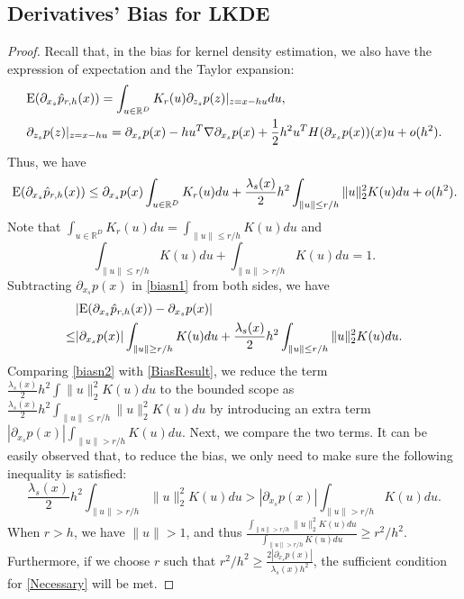 \documentclass[aos,preprint]{imsart}
\theoremstyle{remark}
\begin{document}
\begin{appendix}
\subsection{Derivatives' Bias for LKDE}
\begin{proof}\label{LKDE bias}
Recall that, in the bias for kernel density estimation, we also have the expression of expectation and the Taylor expansion:
\[
\begin{aligned}
&{\rm E} (\partial_{x_s} \hat{p}_{r,h}(x)) = \int_ {u\in \mathbb{R}^D} K_r(u) \partial_{z_s}p(z)|_{z=x-hu} d u,\\
&\partial_{z_s} p(z)|_{z=x-hu}= \partial_{x_s} p(x) -  h u^T\nabla \partial_{x_s} p(x) + \frac{1}{2}h^2 u^T H(\partial_{x_s}p(x))(x)u + o(h^2).
\end{aligned}
\]
Thus, we have
\begin{equation}\label{biasn1}
{\rm E} (\partial_{x_s} \hat{p}_{r,h}(x))  \leq \partial_{x_s} p(x) \int_ {u\in \mathbb{R}^D} K_r(u) du + \frac{\lambda_s(x)}{2} h^2 \int_{\|u\|\leq r/h } \|u\|_2^2 K(u) du + o(h^2).
\end{equation}
Note that $\int_{u\in \mathbb{R}^D} K_r(u) du=\int_{\|u\|\leq r/h} K(u) du$ and 
\[
\int_{\|u\|\leq r/h} K(u) du + \int_{\|u\|> r/h} K(u)du =1.
\]
Subtracting $\partial_{x_s}p(x)$ in \eqref{biasn1} from both sides, we have
\begin{equation}\label{biasn2}
\begin{aligned}
&|{\rm E}( \partial_{x_s} \hat{p}_{r,h}(x)) -  \partial_{x_s} p(x)| \\
\leq &
|\partial_{x_s} p(x)| \int_{\|u\|\geq r/h} K(u) du  + \frac{\lambda_s(x)}{2} h^2 \int_{\|u\|\leq r/h } \|u\|_2^2 K(u) du .
\end{aligned}
\end{equation}
Comparing \eqref{biasn2} with \eqref{BiasResult}, we reduce the term $\frac{\lambda_s(x)}{2} h^2 \int \|u\|_2^2 K(u) du$ to the bounded scope as $\frac{\lambda_s(x)}{2} h^2 \int_{\|u\|\leq r/h } \|u\|_2^2 K(u) du$ by introducing an extra term $|\partial_{x_s} p(x)| \int_{\|u\|> r/h} K(u) du$. Next, we compare the two terms. It can be easily observed that, to reduce the bias, we only need to make sure the following inequality is satisfied:
\begin{equation}\label{Necessary}
\frac{\lambda_s(x)}{2} h^2 \int_{\|u\|> r /h} \|u\|_2^2 K(u) du > |\partial_{x_s} p(x)| \int_{\|u\|> r/h} K(u) du.
\end{equation}
When $r>h$, we have $\|u\|>1$, and thus $\frac{ \int_{\|u\|> r /h} \|u\|_2^2 K(u) du}{ \int_{\|u\|> r/h} K(u) du}\geq r^2/h^2$. Furthermore, if we choose $r$ such that $r^2/h^2\geq\frac{2|\partial_{x_s} p(x)|}{\lambda_s(x) h^2}$, the sufficient  condition for \eqref{Necessary} will be met.
\end{proof}


\end{appendix}
\end{document}
